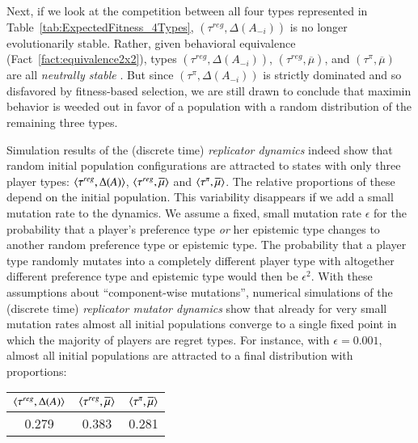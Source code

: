 \documentclass[fleqn,reqno,11pt]{article}
\begin{document}
Next, if we look at the competition between all four types represented in
Table~\ref{tab:ExpectedFitness_4Types}, $(\tau^{reg}, \Delta(A_{-i}))$ is no longer
evolutionarily stable. Rather, given behavioral equivalence (Fact~\ref{fact:equivalence2x2}),
types $(\tau^{reg}, \Delta(A_{-i}))$, $(\tau^{reg}, \overline{\mu})$, and
$(\tau^{\pi}, \overline{\mu})$ are all \emph{neutrally stable}
\citep{Maynard-Smith1982:Evolution-and-t}. But since $(\tau^{\pi}, \Delta(A_{-i}))$ is strictly
dominated and so disfavored by fitness-based selection, we are still drawn to conclude that
maximin behavior is weeded out in favor of a population with a random distribution of the
remaining three types.

Simulation results of the (discrete time) \emph{replicator dynamics}
\citep{TaylorJonker1978:Evolutionary-St} indeed show that random initial population
configurations are attracted to states with only three player types:
$\left \langle \tau^{reg}, \Delta(A)\right\rangle$, $\left \langle \tau^{reg}, \overline{\mu}\right\rangle$ and
$\left \langle \tau^{\pi}, \overline{\mu}\right\rangle$. The relative proportions of these depend on the initial
population. This
variability disappears if we add a small mutation rate to the dynamics. We assume a fixed,
small mutation rate $\epsilon$ for the probability that a player's preference type \emph{or}
her epistemic type changes to another random preference type or epistemic type. The probability
that a player type randomly mutates into a completely different player type with altogether
different preference type and epistemic type would then be $\epsilon^2$. With these assumptions
about ``component-wise mutations'', numerical simulations of the (discrete time)
\emph{replicator mutator dynamics} \citep{Nowak2006:Evolutionary-Dy} show that already for very
small mutation rates almost all initial populations converge to a single fixed point in which
the majority of players are regret types. For instance, with $\epsilon = 0.001$, almost all
initial populations are attracted to a final distribution with proportions:

\begin{center}
  \begin{tabular}{ccc}
    $\left \langle \tau^{reg}, \Delta(A)\right\rangle$ & $\left \langle \tau^{reg},
      \overline{\mu}\right\rangle$ & $\left \langle \tau^{\pi}, \overline{\mu}\right\rangle$ \\ \hline
    0.279  &   0.383 &    0.281 
  \end{tabular}
\end{center}
\end{document}
